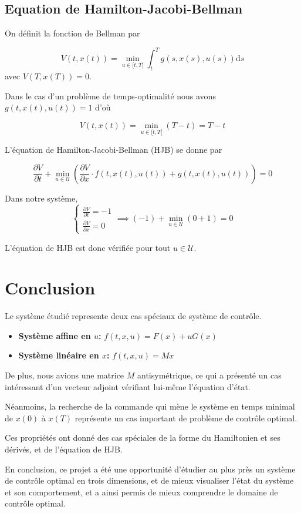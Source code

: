 \documentclass[
  french,
]{article}
\providecommand{\tightlist}{%
  \setlength{\itemsep}{0pt}\setlength{\parskip}{0pt}}
\begin{document}
\hypertarget{equation-de-hamilton-jacobi-bellman}{%
\subsection{Equation de Hamilton-Jacobi-Bellman}\label{equation-de-hamilton-jacobi-bellman}}

On définit la fonction de Bellman par

\[V(t,x(t)) = \min_{u\in[t,T[} \int_t^T g(s, x(s), u(s))\mathrm{d}s\]
avec \(V(T, x(T)) = 0\).

Dans le cas d'un problème de temps-optimalité nous avons
\(g(t, x(t), u(t)) = 1\) d'où

\[V(t, x(t)) = \min_{u\in[t,T[} (T-t) = T-t\]

L'équation de Hamilton-Jacobi-Bellman (HJB) se donne par

\[\frac{\partial V}{\partial t} + \min_{u\in\mathcal{U}}\left(\frac{\partial V}{\partial x}\cdot f(t,x(t),u(t)) + g(t,x(t),u(t))\right) = 0\]

Dans notre système,
\[\begin{cases}
    \frac{\partial V}{\partial t} = -1\\
    \frac{\partial V}{\partial x} = 0
\end{cases}\implies (-1) + \min_{u\in\mathcal{U}}\left(0 + 1\right) = 0\]

L'équation de HJB est donc vérifiée pour tout \(u\in\mathcal{U}\).

\hypertarget{conclusion}{%
\section{Conclusion}\label{conclusion}}

Le système étudié represente deux cas spéciaux de système de contrôle.

\begin{itemize}
\tightlist
\item
  \textbf{Système affine en \(u\):} \(f(t, x, u) = F(x) + uG(x)\)
\item
  \textbf{Système linéaire en \(x\):} \(f(t, x, u) = Mx\)
\end{itemize}

De plus, nous avions une matrice \(M\) antisymétrique,
ce qui a présenté un cas intéressant d'un vecteur adjoint
vérifiant lui-même l'équation d'état.

Néanmoins, la recherche de la commande qui mène le système
en temps minimal de \(x(0)\) à \(x(T)\) représente un cas
important de problème de contrôle optimal.

Ces propriétés ont donné des cas spéciales de la forme
du Hamiltonien et ses dérivés, et de l'équation de HJB.

En conclusion, ce projet a été une opportunité d'étudier
au plus près un système de contrôle optimal en trois dimensions,
et de mieux visualiser l'état du système et son comportement,
et a ainsi permis de mieux comprendre le domaine de contrôle optimal.
\end{document}
